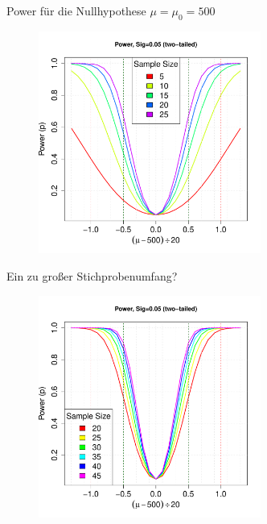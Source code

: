 \documentclass[usenames,dvipsnames,handout]{beamer}
\begin{document}
\begin{frame}{Power für die Nullhypothese $\mu=\mu_{0}=500$}
  \begin{figure}[ht]
 	\centering
 	      \includegraphics[width=0.65\textwidth]{power3.pdf}%
 	\end{figure}
\end{frame}

\begin{frame}{Ein zu großer Stichprobenumfang? }
  \begin{figure}[ht]
 	\centering
 	      \includegraphics[width=0.65\textwidth]{power4.pdf}%
 	\end{figure}
\end{frame}
\end{document}
